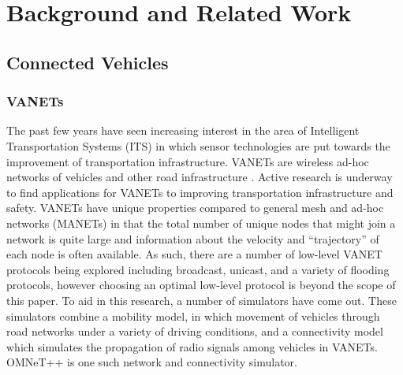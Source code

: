 \documentclass{thesis}
\begin{document}

\chapter{Background and Related Work}
    \label{chap:background}
    \section{Connected Vehicles}
    \subsection{VANETs}
        The past few years have seen increasing interest in the area of Intelligent Transportation
        Systems (ITS) in which sensor technologies are put towards the improvement of
        transportation infrastructure. VANETs are wireless ad-hoc networks of vehicles and other
        road infrastructure \cite{vanet:simulators}. Active research is underway to find applications 
        for VANETs to improving transportation infrastructure and safety. 
        VANETs have unique properties compared to general mesh and ad-hoc networks (MANETs) in that
        the total number of unique nodes that might join a network is quite large and information
        about the velocity and ``trajectory'' of each node is often available.
        As such, there are a number of low-level VANET protocols being explored including broadcast,
        unicast, and a variety of flooding protocols, however choosing an optimal low-level protocol is 
        beyond the scope of this paper.
        To aid in this research, a number of simulators have
        come out. These simulators combine a mobility model, in which movement of vehicles through road
        networks under a variety of driving conditions, and a connectivity model which simulates the
        propagation of radio signals among vehicles in VANETs. OMNeT++ is one such network and connectivity
        simulator.
\end{document}
